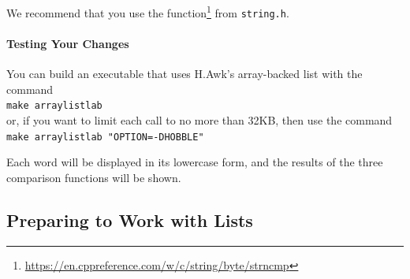 We recommend that you use the  function\footnote{\url{https://en.cppreference.com/w/c/string/byte/strncmp}} from \texttt{string.h}.

\paragraph{Testing Your Changes}

You can build an executable that uses H.Awk's array-backed list with the command \\
\verb+make arraylistlab+ \\
or, if you want to limit each  call to no more than 32KB, then use the command \\
\verb+make arraylistlab "OPTION=-DHOBBLE"+

\begin{description}
\end{description}

Each word will be displayed in its lowercase form, and the results of the three comparison functions will be shown.

\begin{description}
\end{description}


\subsection{Preparing to Work with Lists}

